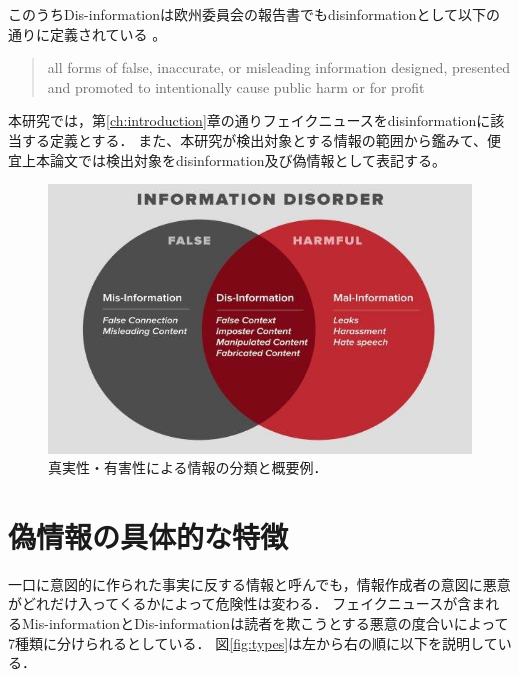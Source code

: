 このうちDis-informationは欧州委員会の報告書でもdisinformationとして以下の通りに定義されている \cite{doi/10.2759/739290}。

\begin{quote}
    all forms of false, inaccurate, or misleading information designed, presented and promoted to intentionally cause public harm or for profit
\end{quote}

本研究では，第\ref{ch:introduction}章の通りフェイクニュースをdisinformationに該当する定義とする．
また、本研究が検出対象とする情報の範囲から鑑みて、便宜上本論文では検出対象をdisinformation及び偽情報として表記する。

\begin{figure}[p]
    \includegraphics[width=\linewidth]{figures/fig_disorder.jpg}
    \caption{真実性・有害性による情報の分類と概要例\cite{wardle2017information}．}
    \label{fig:info}
\end{figure}

\section{偽情報の具体的な特徴}
一口に意図的に作られた事実に反する情報と呼んでも，情報作成者の意図に悪意がどれだけ入ってくるかによって危険性は変わる．
フェイクニュースが含まれるMis-informationとDis-informationは読者を欺こうとする悪意の度合いによって7種類に分けられるとしている\cite{wardle_2017}．
図\ref{fig:types}は左から右の順に以下を説明している．

